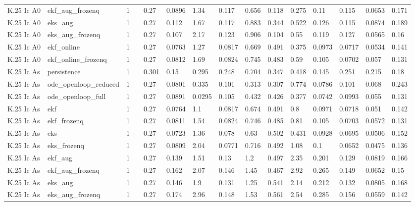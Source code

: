 \begin{table}[t]
\begin{tabular}{lllllllllllllll}
K.25 Ic A0 & ekf\_aug\_frozenq & 1 &  & 0.27 & 0.0896 & 1.34 & 0.117 & 0.656 & 0.118 & 0.275 & 0.11 & 0.115 & 0.0653 & 0.171 \\
K.25 Ic A0 & eks\_aug & 1 &  & 0.27 & 0.112 & 1.67 & 0.117 & 0.883 & 0.344 & 0.522 & 0.126 & 0.115 & 0.0874 & 0.189 \\
K.25 Ic A0 & eks\_aug\_frozenq & 1 &  & 0.27 & 0.107 & 2.17 & 0.123 & 0.906 & 0.104 & 0.55 & 0.119 & 0.127 & 0.0565 & 0.16 \\
K.25 Ic A0 & ekf\_online & 1 &  & 0.27 & 0.0763 & 1.27 & 0.0817 & 0.669 & 0.491 & 0.375 & 0.0973 & 0.0717 & 0.0534 & 0.141 \\
K.25 Ic A0 & ekf\_online\_frozenq & 1 &  & 0.27 & 0.0812 & 1.69 & 0.0824 & 0.745 & 0.483 & 0.59 & 0.105 & 0.0702 & 0.057 & 0.131 \\
K.25 Ic As & persistence & 1 &  & 0.301 & 0.15 & 0.295 & 0.248 & 0.704 & 0.347 & 0.418 & 0.145 & 0.251 & 0.215 & 0.18 \\
K.25 Ic As & ode\_openloop\_reduced & 1 &  & 0.27 & 0.0801 & 0.335 & 0.101 & 0.313 & 0.307 & 0.774 & 0.0786 & 0.101 & 0.068 & 0.243 \\
K.25 Ic As & ode\_openloop\_full & 1 &  & 0.27 & 0.0891 & 0.0295 & 0.105 & 0.432 & 0.426 & 0.377 & 0.0742 & 0.0993 & 0.055 & 0.131 \\
K.25 Ic As & ekf & 1 &  & 0.27 & 0.0764 & 1.1 & 0.0817 & 0.674 & 0.491 & 0.8 & 0.0971 & 0.0718 & 0.051 & 0.142 \\
K.25 Ic As & ekf\_frozenq & 1 &  & 0.27 & 0.0811 & 1.54 & 0.0824 & 0.746 & 0.485 & 0.81 & 0.105 & 0.0703 & 0.0572 & 0.131 \\
K.25 Ic As & eks & 1 &  & 0.27 & 0.0723 & 1.36 & 0.078 & 0.63 & 0.502 & 0.431 & 0.0928 & 0.0695 & 0.0506 & 0.152 \\
K.25 Ic As & eks\_frozenq & 1 &  & 0.27 & 0.0809 & 2.04 & 0.0771 & 0.716 & 0.492 & 1.08 & 0.1 & 0.0652 & 0.0475 & 0.136 \\
K.25 Ic As & ekf\_aug & 1 &  & 0.27 & 0.139 & 1.51 & 0.13 & 1.2 & 0.497 & 2.35 & 0.201 & 0.129 & 0.0819 & 0.166 \\
K.25 Ic As & ekf\_aug\_frozenq & 1 &  & 0.27 & 0.162 & 2.07 & 0.146 & 1.45 & 0.467 & 2.92 & 0.265 & 0.149 & 0.0652 & 0.15 \\
K.25 Ic As & eks\_aug & 1 &  & 0.27 & 0.146 & 1.9 & 0.131 & 1.25 & 0.541 & 2.14 & 0.212 & 0.132 & 0.0805 & 0.168 \\
K.25 Ic As & eks\_aug\_frozenq & 1 &  & 0.27 & 0.174 & 2.96 & 0.148 & 1.53 & 0.561 & 2.54 & 0.285 & 0.156 & 0.0559 & 0.142 \\

\end{tabular}
\end{table}
